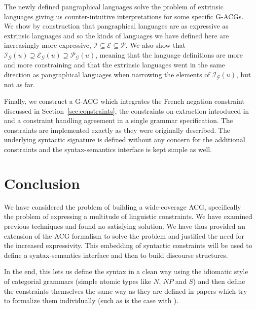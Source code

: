 \documentclass{llncs}
\begin{document}
The newly defined pangraphical languages solve the problem of extrinsic
languages giving us counter-intuitive interpretations for some specific
G-ACGs. We show by construction that pangraphical languages are as
expressive as extrinsic languages and so the kinds of languages we have
defined here are increasingly more expressive, $\mathcal{I} \subseteq
\mathcal{E} \subseteq \mathcal{P}$. We also show that
$\mathcal{I}_{\mathcal{G}}(u) \supseteq \mathcal{E}_{\mathcal{G}}(u)
\supseteq \mathcal{P}_{\mathcal{G}}(u)$, meaning that the language
definitions are more and more constraining and that the extrinsic
languages went in the same direction as pangraphical languages when
narrowing the elements of $\mathcal{I}_{\mathcal{G}}(u)$, but not as
far.

Finally, we construct a G-ACG which integrates the French negation constraint
discussed in Section~\ref{sec:constraints}, the constraints on extraction
introduced in \cite{pogodalla2012controlling} and a constraint handling
agreement in a single grammar specification. The constraints are implemented
exactly as they were originally described. The underlying syntactic signature
is defined without any concern for the additional constraints and the
syntax-semantics interface is kept simple as well.


\section{Conclusion}

We have considered the problem of building a wide-coverage ACG, specifically
the problem of expressing a multitude of linguistic constraints. We have
examined previous techniques and found no satisfying solution. We have thus
provided an extension of the ACG formalism to solve the problem and justified
the need for the increased expressivity. This embedding of syntactic
constraints will be used to define a syntax-semantics interface and then to
build discourse structures.

In the end, this lets us define the syntax in a clean way using the idiomatic
style of categorial grammars (simple atomic types like $N$, $NP$ and $S$) and
then define the constraints themselves the same way as they are defined in
papers which try to formalize them individually (such as is the case with
\cite{pogodalla2012controlling}).

%
%



\end{document}
